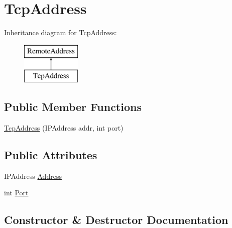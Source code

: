 \hypertarget{classOTA_1_1Callbacks_1_1TcpAddress}{}\section{Tcp\+Address}
\label{classOTA_1_1Callbacks_1_1TcpAddress}
Inheritance diagram for Tcp\+Address\+:\begin{figure}[H]
\begin{center}
\leavevmode
\includegraphics[height=2.000000cm]{classOTA_1_1Callbacks_1_1TcpAddress}
\end{center}
\end{figure}
\subsection*{Public Member Functions}
\begin{DoxyCompactItemize}
\item 
\hyperlink{classOTA_1_1Callbacks_1_1TcpAddress_a476037861b3fa1eaecbc297edb515d55}{Tcp\+Address} (I\+P\+Address addr, int port)
\end{DoxyCompactItemize}
\subsection*{Public Attributes}
\begin{DoxyCompactItemize}
\item 
I\+P\+Address \hyperlink{classOTA_1_1Callbacks_1_1TcpAddress_a71b78b11b2ca8123b86f6ba4f5ec4a19}{Address}
\item 
int \hyperlink{classOTA_1_1Callbacks_1_1TcpAddress_a91b1a1342df7fe9e51fb5dfc4999dfe8}{Port}
\end{DoxyCompactItemize}


\subsection{Constructor \& Destructor Documentation}
\hypertarget{classOTA_1_1Callbacks_1_1TcpAddress_a476037861b3fa1eaecbc297edb515d55}{}
